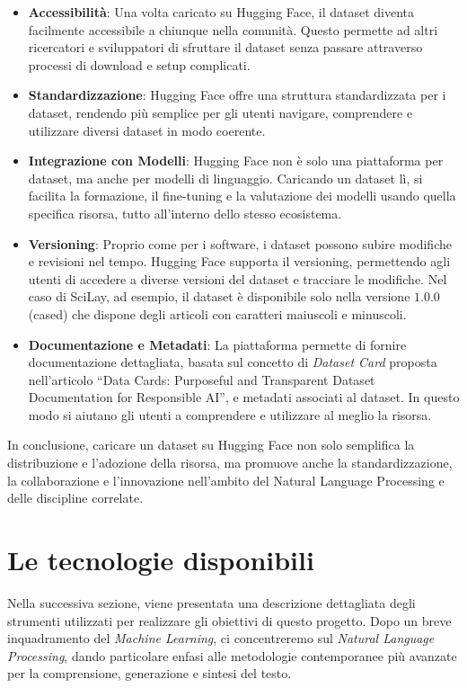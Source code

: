 \documentclass[12pt,a4paper,twoside,openright]{book}
\begin{document}
\begin{itemize}
    \item \textbf{Accessibilità}: Una volta caricato su Hugging Face, il dataset diventa facilmente accessibile a chiunque nella comunità. Questo permette ad altri ricercatori e sviluppatori di sfruttare il dataset senza passare attraverso processi di download e setup complicati.
    \item \textbf{Standardizzazione}: Hugging Face offre una struttura standardizzata per i dataset, rendendo più semplice per gli utenti navigare, comprendere e utilizzare diversi dataset in modo coerente. 
    \item \textbf{Integrazione con Modelli}: Hugging Face non è solo una piattaforma per dataset, ma anche per modelli di linguaggio. Caricando un dataset lì, si facilita la formazione, il fine-tuning e la valutazione dei modelli usando quella specifica risorsa, tutto all'interno dello stesso ecosistema.
    \item \textbf{Versioning}: Proprio come per i software, i dataset possono subire modifiche e revisioni nel tempo. Hugging Face supporta il versioning, permettendo agli utenti di accedere a diverse versioni del dataset e tracciare le modifiche. Nel caso di SciLay, ad esempio, il dataset è disponibile solo nella versione $1.0.0$ (cased) che dispone degli articoli con caratteri maiuscoli e minuscoli.
    \item \textbf{Documentazione e Metadati}: La piattaforma permette di fornire documentazione dettagliata, basata sul concetto di \emph{Dataset Card} proposta nell'articolo ``Data Cards: Purposeful and Transparent Dataset Documentation for Responsible AI''\cite{pushkarna2022data}, e metadati associati al dataset. In questo modo si aiutano gli utenti a comprendere e utilizzare al meglio la risorsa.
\end{itemize}

In conclusione, caricare un dataset su Hugging Face non solo semplifica la distribuzione e l'adozione della risorsa, ma promuove anche la standardizzazione, la collaborazione e l'innovazione nell'ambito del Natural Language Processing e delle discipline correlate. 


\chapter{Le tecnologie disponibili}
\label{cap:ml}

Nella successiva sezione, viene presentata una descrizione dettagliata degli strumenti utilizzati per realizzare gli obiettivi di questo progetto. Dopo un breve inquadramento del \emph{Machine Learning}, ci concentreremo sul \emph{Natural Language Processing}, dando particolare enfasi alle metodologie contemporanee più avanzate per la comprensione, generazione e sintesi del testo.
\end{document}
